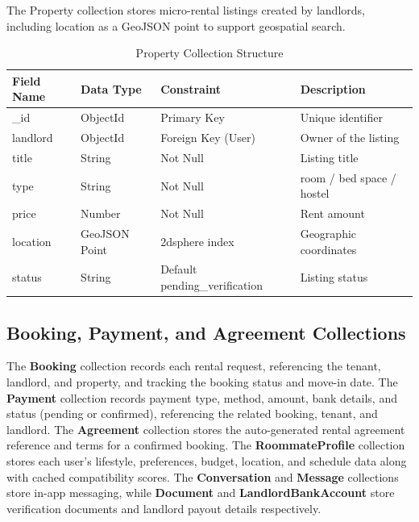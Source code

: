The Property collection stores micro-rental listings created by landlords, including location as a GeoJSON point to support geospatial search.

\begin{table}[h]
\centering
\caption{Property Collection Structure}

\begin{tabularx}{\textwidth}{|>{\raggedright\arraybackslash}p{3cm}|>{\raggedright\arraybackslash}p{3cm}|>{\raggedright\arraybackslash}p{3cm}|X|}
\hline
\textbf{Field Name} & \textbf{Data Type} & \textbf{Constraint} & \textbf{Description} \\
\hline
\_id & ObjectId & Primary Key & Unique identifier \\
\hline
landlord & ObjectId & Foreign Key (User) & Owner of the listing \\
\hline
title & String & Not Null & Listing title \\
\hline
type & String & Not Null & room / bed space / hostel \\
\hline
price & Number & Not Null & Rent amount \\
\hline
location & GeoJSON Point & 2dsphere index & Geographic coordinates \\
\hline
status & String & Default pending\_verification & Listing status \\
\hline
\end{tabularx}

\end{table}

\subsection{Booking, Payment, and Agreement Collections}

The \textbf{Booking} collection records each rental request, referencing the tenant, landlord, and property, and tracking the booking status and move-in date. The \textbf{Payment} collection records payment type, method, amount, bank details, and status (pending or confirmed), referencing the related booking, tenant, and landlord. The \textbf{Agreement} collection stores the auto-generated rental agreement reference and terms for a confirmed booking. The \textbf{RoommateProfile} collection stores each user's lifestyle, preferences, budget, location, and schedule data along with cached compatibility scores. The \textbf{Conversation} and \textbf{Message} collections store in-app messaging, while \textbf{Document} and \textbf{LandlordBankAccount} store verification documents and landlord payout details respectively.

